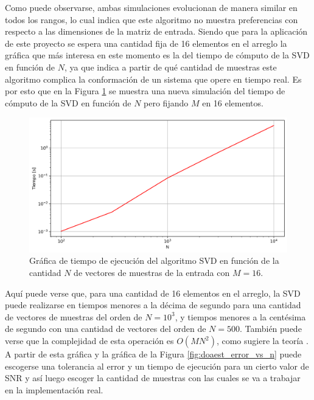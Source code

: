 Como puede observarse, ambas simulaciones evolucionan de manera similar en todos los rangos, lo cual indica que este algoritmo no muestra preferencias con respecto a las dimensiones de la matriz de entrada. Siendo que para la aplicación de este proyecto se espera una cantidad fija de 16 elementos en el arreglo la gráfica que más interesa en este momento es la del tiempo de cómputo de la SVD en función de $N$, ya que indica a partir de qué cantidad de muestras este algoritmo complica la conformación de un sistema que opere en tiempo real. Es por esto que en la Figura \ref{fig:svd_vs_n_16} se muestra una nueva simulación del tiempo de cómputo de la SVD en función de $N$ pero fijando $M$ en 16 elementos.
\begin{figure}[ht!]
    \centering
    \includegraphics[width=0.9\linewidth]{images/03-DOAEst/svd_vs_n_16.png}
    \caption{Gráfica de tiempo de ejecución del algoritmo SVD en función de la cantidad $N$ de vectores de muestras de la entrada con $M=16$.}
    \label{fig:svd_vs_n_16}
\end{figure}

Aquí puede verse que, para una cantidad de 16 elementos en el arreglo, la SVD puede realizarse en tiempos menores a la décima de segundo para una cantidad de vectores de muestras del orden de $N=10^3$, y tiempos menores a la centésima de segundo con una cantidad de vectores del orden de $N=500$. También puede verse que la complejidad de esta operación es $O(MN^2)$, como sugiere la teoría \cite{bib:esprit_roy}. A partir de esta gráfica y la gráfica de la Figura \ref{fig:doaest_error_vs_n} puede escogerse una tolerancia al error y un tiempo de ejecución para un cierto valor de SNR y así luego escoger la cantidad de muestras con las cuales se va a trabajar en la implementación real.

